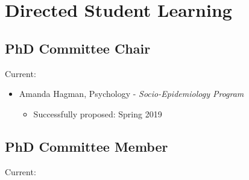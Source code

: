 \documentclass[11pt,a4paper,]{moderncv}
\providecommand{\tightlist}{%
	\setlength{\itemsep}{0pt}\setlength{\parskip}{0pt}}
\begin{document}
\clearpage

\hypertarget{directed-student-learning}{%
\section{Directed Student Learning}\label{directed-student-learning}}

\hypertarget{phd-committee-chair}{%
\subsection{PhD Committee Chair}\label{phd-committee-chair}}

Current:

\begin{itemize}
\tightlist
\item
  Amanda Hagman, Psychology - \emph{Socio-Epidemiology Program}

  \begin{itemize}
  \tightlist
  \item
    Successfully proposed: Spring 2019
  \end{itemize}
\end{itemize}

\hypertarget{phd-committee-member}{%
\subsection{PhD Committee Member}\label{phd-committee-member}}

Current:
\end{document}
